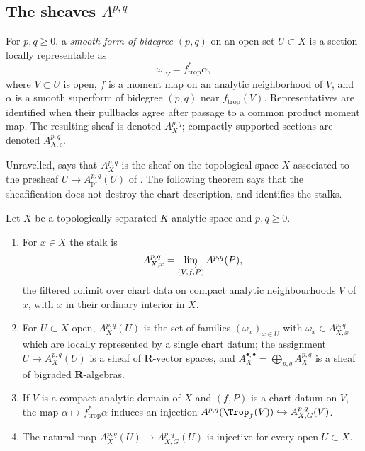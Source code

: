 \subsection{The sheaves \texorpdfstring{$A^{p,q}$}{Apq}}
\label{sec:ch13-sheaves}

\begin{definition}
\label{def:ch13-cld-form}
For $p,q\geq0$, a \emph{smooth form of bidegree $(p,q)$} on an open set
$U\subset X$ is a section locally representable as
\[
                    \omega|_V=f_{\mathrm{trop}}^*\alpha,
\]
where $V\subset U$ is open, $f$ is a moment map on an analytic neighborhood
of $V$, and $\alpha$ is a smooth superform of bidegree $(p,q)$ near
$f_{\mathrm{trop}}(V)$.  Representatives are identified when their pullbacks
agree after passage to a common product moment map.  The resulting sheaf is
denoted $A_X^{p,q}$; compactly supported sections are denoted
$A_{X,c}^{p,q}$.
\end{definition}

Unravelled,  says that $A^{p,q}_X$ is the sheaf on
the topological space $X$ associated to the presheaf
$U\mapsto A^{p,q}_{\mathrm{pf}}(U)$ of .  The
following theorem says that the sheafification does not destroy the chart
description, and identifies the stalks.

\begin{theorem}
\label{thm:ch13-sheaf}
Let $X$ be a topologically separated $K$-analytic space and $p,q\ge0$.
\begin{enumerate}
\item\label{itm:ch13-sheaf:stalk} For $x\in X$ the stalk is
  \[
   A^{p,q}_{X,x}
   =\varinjlim_{(V,f,P)}A^{p,q}(P),
  \]
  the filtered colimit over chart data on compact analytic neighbourhoods
  $V$ of $x$, with $x$ in their ordinary interior in $X$.
\item\label{itm:ch13-sheaf:sections} For $U\subset X$ open,
  $A^{p,q}_X(U)$ is the set of families $(\omega_x)_{x\in U}$ with
  $\omega_x\in A^{p,q}_{X,x}$ which are locally represented by a single
  chart datum; the assignment $U\mapsto A^{p,q}_X(U)$ is a sheaf of
  $\mathbf R$-vector spaces, and
  $A^{\bullet,\bullet}_X=\bigoplus_{p,q}A^{p,q}_X$ is a sheaf of bigraded
  $\mathbf R$-algebras.
\item\label{itm:ch13-sheaf:faithful} If $V$ is a compact analytic domain of
  $X$ and $(f,P)$ is a chart datum on $V$, the map
  $\alpha\mapsto f_{\mathrm{trop}}^*\alpha$ induces an injection
  $A^{p,q}(\Trop_f(V))\hookrightarrow A^{p,q}_{X,G}(V)$.
\item\label{itm:ch13-sheaf:GvsO} The natural map
  $A^{p,q}_X(U)\to A^{p,q}_{X,G}(U)$ is injective for every open
  $U\subset X$.
\end{enumerate}
\end{theorem}

